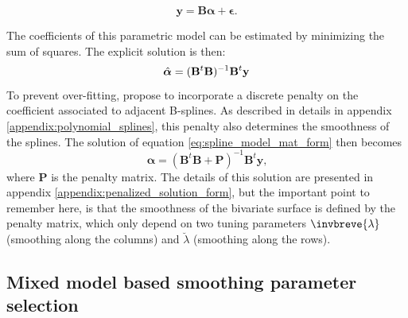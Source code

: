 \begin{equation}
    \boldsymbol{y} = \boldsymbol{B}\boldsymbol{\alpha} + \boldsymbol{\epsilon}
    \text{.}
    \label{eq:spline_model_mat_form}
\end{equation}

The coefficients of this parametric model can be estimated by minimizing the sum of squares. The explicit solution is then:
\begin{equation}
	\Hat{\boldsymbol{\alpha}} = (\mathbf{B}^t\mathbf{B})^{-1}\mathbf{B}^t\mathbf{y}
\end{equation}
To prevent over-fitting, 
\textcite{eilers_flexible_1996} propose to incorporate a discrete penalty on the coefficient associated to adjacent B-splines.
As described in details in appendix \ref{appendix:polynomial_splines}, this penalty also determines the smoothness of the 
splines. The solution of equation \ref{eq:spline_model_mat_form} then becomes 
\begin{equation}
    \widehat{\boldsymbol{\alpha}}=\left(\boldsymbol{B}^{t} \boldsymbol{B}+\boldsymbol{P}\right)^{-1} \boldsymbol{B}^{t} 
    \boldsymbol{y}
    \text{,}
\end{equation}
where $\boldsymbol{P}$ is the penalty matrix. The details of this solution are presented in appendix 
\ref{appendix:penalized_solution_form}, but the important point to remember here, is that the smoothness of the bivariate 
surface is defined by the penalty matrix, which only depend on two tuning parameters  $\invbreve{\lambda}$ (smoothing along the 
columns) and $\breve{\lambda}$ (smoothing along the rows).

\subsection{Mixed model based smoothing parameter selection}


